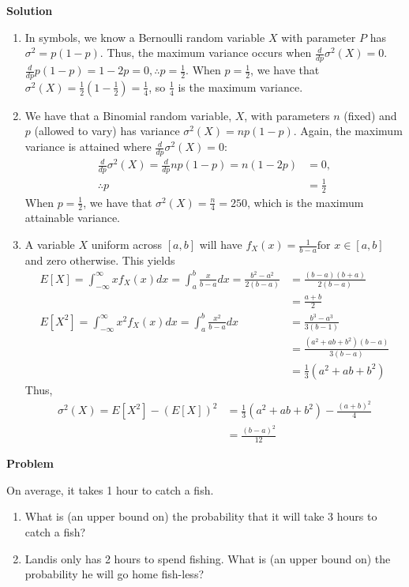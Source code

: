 \documentclass[11pt]{article}
\newcounter{problem}
\newcounter{solution}
\newcommand\Problem{%
  \stepcounter{problem}%
  \textbf{Problem \theproblem}~%
  \setcounter{solution}{0}%
}
\newcommand\TheSolution{%
  \textbf{Solution}\:\:%
}
\begin{document}
\TheSolution
\begin{enumerate}
\item
  In symbols, we know a Bernoulli random variable $X$ with parameter $P$ has
  $\sigma^2=p(1-p)$. Thus, the maximum variance occurs when
  $\frac{d}{dp}\sigma^2(X)=0$. $\frac{d}{dp} p(1-p) = 1-2p = 0, \therefore
  p=\frac{1}{2}$. When $p = \frac{1}{2}$, we have that
  $\sigma^2(X)=\frac{1}{2}(1-\frac{1}{2}) = \frac{1}{4}$, so $\frac{1}{4}$ is
  the maximum variance.
\item
  We have that a Binomial random variable, $X$, with parameters $n$ (fixed) and
  $p$ (allowed to vary) has variance $\sigma^2(X) = np(1 - p)$. Again, the maximum
  variance is attained where $\frac{d}{dp}\sigma^2(X)=0$:
  \begin{align}
    \frac{d}{dp}\sigma^2(X)=\frac{d}{dp}np(1-p)=n(1-2p)&=0, \\
    \therefore p &= \frac{1}{2}
  \end{align}
  When $p=\frac{1}{2}$, we have that $\sigma^2(X)=\frac{n}{4} = 250$, which is the
  maximum attainable variance.
\item
  A variable $X$ uniform across $[a,b]$ will have $f_X(x)=\frac{1}{b-a} \text{
    for } x \in [a,b]$ and zero otherwise. This yields
  \begin{align}
    E[X] = \int_{-\infty}^\infty xf_X(x)dx = \int_a^b \frac{x}{b-a}dx = \frac{b^2-a^2}{2(b-a)} &= \frac{(b-a)(b+a)}{2(b-a)} \\
&= \frac{a+b}{2} \\
E[X^2] = \int_{-\infty}^\infty x^2f_X(x)dx = \int_a^b\frac{x^2}{b-a}dx &= \frac{b^3-a^3}{3(b-1)} \\
    &= \frac{(a^2+ab+b^2)(b-a)}{3(b-a)} \\
    &= \frac{1}{3}(a^2+ab+b^2)
  \end{align}
  Thus,
  \begin{align}
    \sigma^2(X) = E[X^2]-(E[X])^2 &= \frac{1}{3}(a^2+ab+b^2) - \frac{(a+b)^2}{4} \\
    &= \frac{(b-a)^2}{12}
  \end{align}
\end{enumerate}

  \Problem
  On average, it takes 1 hour to catch a fish.
  \begin{enumerate}
  \item What is (an upper bound on) the probability that it will take 3 hours to
    catch a fish?
  \item Landis only has 2 hours to spend fishing. What is (an upper bound on)
    the probability he will go home fish-less?
  \end{enumerate}
\end{document}

